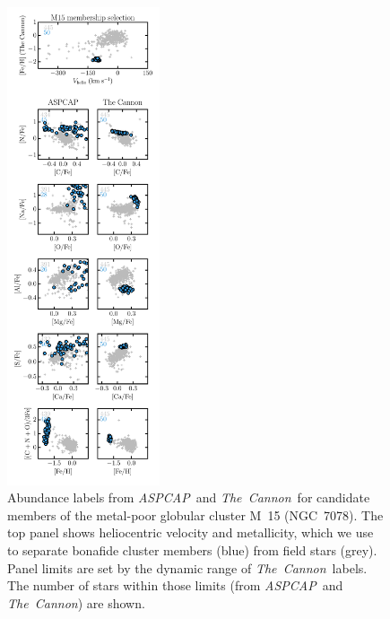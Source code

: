 \documentclass[12pt,preprint]{aastex}
\newcommand{\project}[1]{\textsl{#1}}
\newcommand{\TheCannon}{\project{The~Cannon}}
\newcommand{\acronym}[1]{{\small{#1}}}
\newcommand{\aspcap}{\project{\acronym{ASPCAP}}}
\begin{document}
\begin{figure}[p]
\includegraphics[width=0.40\textwidth]{M15_comparison.pdf}
\caption{Abundance labels from \aspcap\ and \TheCannon\ for candidate
members of the metal-poor globular cluster M~15 (NGC~7078).  The top panel
shows heliocentric velocity and metallicity, which we use to separate
bonafide cluster members (blue) from field stars (grey). Panel limits
are set by the dynamic range of \TheCannon\ labels.  The number of stars
within those limits (from \aspcap\ and \TheCannon) are shown.\label{fig:m15-comparison}}
\end{figure}

\clearpage
\end{document}
